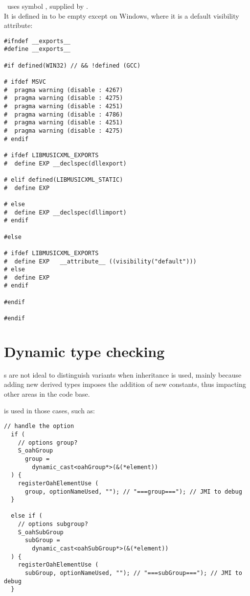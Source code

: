 \mf\ uses symbol , supplied by \libmusicxmlSamples. \\
It is defined in  to be empty except on Windows, where it is a default visibility attribute:
\begin{lstlisting}[language=CPlusPlus]
#ifndef __exports__
#define __exports__

#if defined(WIN32) // && !defined (GCC)

# ifdef MSVC
#  pragma warning (disable : 4267)
#  pragma warning (disable : 4275)
#  pragma warning (disable : 4251)
#  pragma warning (disable : 4786)
#  pragma warning (disable : 4251)
#  pragma warning (disable : 4275)
# endif

# ifdef LIBMUSICXML_EXPORTS
#  define EXP __declspec(dllexport)

# elif defined(LIBMUSICXML_STATIC)
#  define EXP

# else
#  define EXP __declspec(dllimport)
# endif

#else

# ifdef LIBMUSICXML_EXPORTS
#  define EXP	__attribute__ ((visibility("default")))
# else
#  define EXP
# endif

#endif

#endif
\end{lstlisting}


\section{Dynamic type checking}

\EnumType s are not ideal to distinguish variants when inheritance is used, mainly because adding new derived types imposes the addition of new constants, thus impacting other areas in the code base.

 is used in those cases, such as:
\begin{lstlisting}[language=CPlusPlus]
  // handle the option
  if (
    // options group?
    S_oahGroup
      group =
        dynamic_cast<oahGroup*>(&(*element))
  ) {
    registerOahElementUse (
      group, optionNameUsed, ""); // "===group==="); // JMI to debug
  }

  else if (
    // options subgroup?
    S_oahSubGroup
      subGroup =
        dynamic_cast<oahSubGroup*>(&(*element))
  ) {
    registerOahElementUse (
      subGroup, optionNameUsed, ""); // "===subGroup==="); // JMI to debug
  }
\end{lstlisting}


